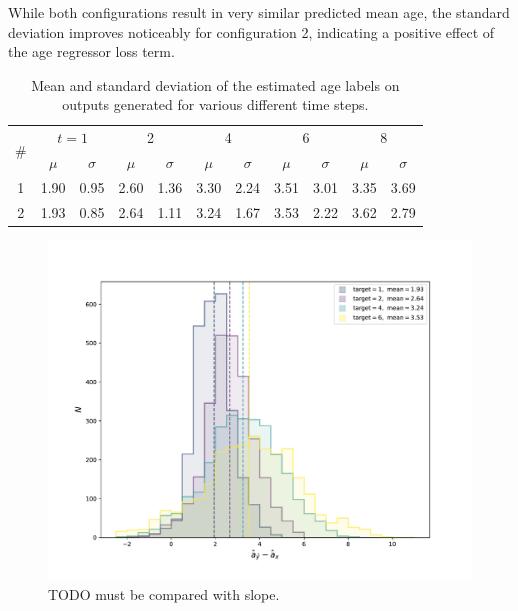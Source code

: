 While both configurations result in very similar predicted mean age, the standard deviation improves noticeably for configuration 2, indicating a positive effect of the age regressor loss term.

\begin{table}[h]
	\begin{center}
		\begin{tabular}{c c c c c c c c c c c}
			\toprule
			\multirow{2}{*}{\#} &
			\multicolumn{2}{c}{$t = 1$} &
			\multicolumn{2}{c}{2} &
			\multicolumn{2}{c}{4} &
			\multicolumn{2}{c}{6} &
			\multicolumn{2}{c}{8} \\
			\cmidrule(lr){2-3}
			\cmidrule(lr){4-5}
			\cmidrule(lr){6-7}
			\cmidrule(lr){8-9}
			\cmidrule(lr){10-11}
			 & $\mu$ & $\sigma$ & $\mu$ & $\sigma$ & $\mu$ & $\sigma$ & $\mu$ & $\sigma$ & $\mu$ & $\sigma$ \\
			\cmidrule(lr){1-11}
			1 & 1.90 & 0.95 & 2.60 & 1.36 & 3.30 & 2.24 & 3.51 & 3.01 & 3.35 & 3.69 \\
			2 & 1.93 & 0.85 & 2.64 & 1.11 & 3.24 & 1.67 & 3.53 & 2.22 & 3.62 & 2.79 \\
			\bottomrule
		\end{tabular}
		\caption{Mean and standard deviation of the estimated age labels on outputs generated for various different time steps.}
		\label{tab:expfixed}
	\end{center}
\end{table}

\begin{figure}
	\centering
	\includegraphics[width=\linewidth]{images/age_plots/hist_fixed}
	\vspace*{-15pt}
	\caption{TODO must be compared with slope.}
	\label{fig:expfixedhist}
\end{figure}


